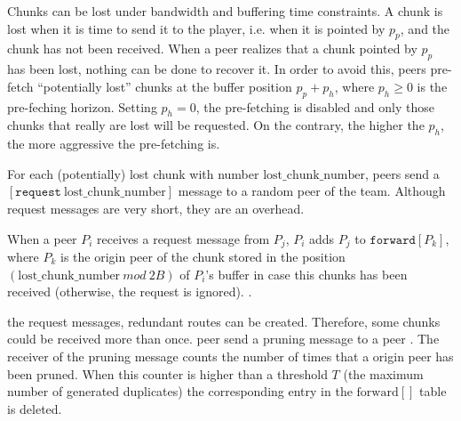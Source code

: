 

\label{sec:routes_discovery}

Chunks can be lost under bandwidth and buffering time constraints. A
chunk is lost when it is time to send it to the player, i.e. when it
is pointed by $p_p$, and the chunk has not been received.  When a peer
realizes that a chunk pointed by $p_p$ has been lost, nothing can be
done to recover it. In order to avoid this, peers pre-fetch
``potentially lost'' chunks at the buffer position $p_p+p_h$, where
$p_h\geq 0$ is the pre-feching horizon. Setting $p_h=0$, the
pre-fetching is disabled and only those chunks that really are lost
will be requested.  On the contrary, the higher the $p_h$, the more
aggressive the pre-fetching is.

For each (potentially) lost chunk with number
$\text{lost\_chunk\_number}$, peers send a
$[\mathtt{request}~\text{lost\_chunk\_number}]$ message to a random
peer of the team.   Although request messages are very short, they are an overhead.

When a peer $P_i$ receives a request message from $P_j$, $P_i$ adds $P_j$ to
$\mathtt{forward}[P_k]$, where $P_k$ is the origin peer of the chunk
stored in the position $(\text{lost\_chunk\_number}~\mathit{mod}~2B)$
of $P_i$'s buffer in case this chunks has been received (otherwise,
the request is ignored). . 

 the request messages, redundant routes can be created. Therefore, some chunks could be received more than once.  peer send a pruning message to a peer . The receiver of the pruning message counts the number of times that a origin peer has
been  pruned. When this counter is higher than a threshold $T$ (the
maximum number of generated duplicates) the corresponding entry in the $\text{forward}[]$ table is deleted.

